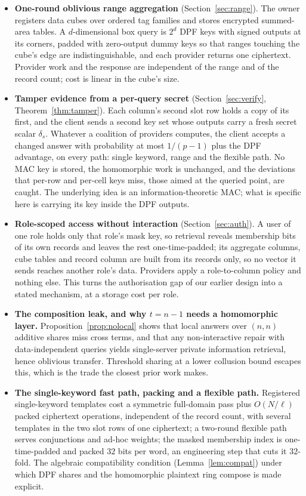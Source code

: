 \documentclass[a4paper,fleqn]{cas-sc}
\begin{document}
\begin{itemize}
\item \textbf{One-round oblivious range aggregation} (Section~\ref{sec:range}).
The owner registers data cubes over ordered tag families and stores encrypted
summed-area tables. A $d$-dimensional box query is $2^d$ DPF keys with signed
outputs at its corners, padded with zero-output dummy keys so that ranges
touching the cube's edge are indistinguishable, and each provider returns one
ciphertext. Provider work and the response are independent of the range and of
the record count; cost is linear in the cube's size.

\item \textbf{Tamper evidence from a per-query secret}
(Section~\ref{sec:verify}, Theorem~\ref{thm:tamper}). Each column's second slot
row holds a copy of its first, and the client sends a second key set whose
outputs carry a fresh secret scalar $\delta_s$. Whatever a coalition of
providers computes, the client accepts a changed answer with probability at
most $1/(p-1)$ plus the DPF advantage, on every path: single keyword, range and
the flexible path. No MAC key is stored, the homomorphic work is unchanged, and
the deviations that per-row and per-cell keys miss, those aimed at the queried
point, are caught. The underlying idea is an information-theoretic MAC; what
is specific here is carrying its key inside the DPF outputs.

\item \textbf{Role-scoped access without interaction} (Section~\ref{sec:auth}).
A user of one role holds only that role's mask key, so retrieval reveals
membership bits of its own records and leaves the rest one-time-padded; its
aggregate columns, cube tables and record column are built from its records
only, so no vector it sends reaches another role's data. Providers apply a
role-to-column policy and nothing else. This turns the authorisation gap of our
earlier design into a stated mechanism, at a storage cost per role.

\item \textbf{The composition leak, and why $t=n-1$ needs a homomorphic layer.}
Proposition~\ref{prop:nolocal} shows that local answers over $(n,n)$ additive
shares miss cross terms, and that any non-interactive repair with
data-independent queries yields single-server private information retrieval,
hence oblivious transfer. Threshold sharing at a lower collusion bound escapes
this, which is the trade the closest prior work makes.

\item \textbf{The single-keyword fast path, packing and a flexible path.}
Registered single-keyword templates cost a symmetric full-domain pass plus
$O(N/\ell)$ packed ciphertext operations, independent of the record count, with
several templates in the two slot rows of one ciphertext; a two-round flexible
path serves conjunctions and ad-hoc weights; the masked membership index is
one-time-padded and packed $32$ bits per word, an engineering step that cuts it
$32$-fold. The algebraic compatibility condition (Lemma~\ref{lem:compat}) under
which DPF shares and the homomorphic plaintext ring compose is made explicit.


\end{itemize}
\end{document}
